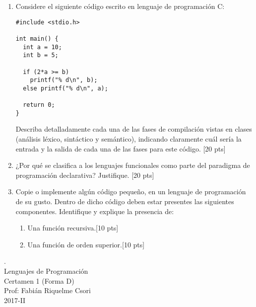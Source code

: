\documentclass[letter,12pt,oneside]{book}
\theoremstyle{definition}
\begin{document}
\begin{enumerate}
    \item Considere el siguiente código escrito en lenguaje de programación C:
    
    \begin{lstlisting}[style=CStyle]
#include <stdio.h>

int main() {
  int a = 10;
  int b = 5;
  
  if (2*a >= b)
    printf("% d\n", b);
  else printf("% d\n", a);
  
  return 0;
}
\end{lstlisting}
Describa detalladamente cada una de las fases de compilación vistas en clases (análisis léxico, sintáctico y semántico), indicando claramente cuál sería la entrada y la salida de cada una de las fases para este código. \tabto{80ex}[20 pts]
    
\item ¿Por qué se clasifica a los lenguajes funcionales como parte del paradigma de programación declarativa? Justifique. \tabto{80ex}[20 pts]

\item Copie o implemente algún código pequeño, en un lenguaje de programación de su gusto. Dentro de dicho código deben estar presentes las siguientes componentes. Identifique y explique la presencia de:
    \begin{enumerate}
    \item Una función recursiva.\tabto{75ex}[10 pts]
    \item Una función de orden superior.\tabto{75ex}[10 pts]
    \end{enumerate}
\end{enumerate}

\newpage

\begin{center}
 {\Large
  {\color{white}.}\\[5ex]
  Lenguajes de Programación\\[1ex]
  Certamen 1 (Forma D)}\\[1.2ex]
  Prof: Fabián Riquelme Csori\\
  2017-II
\end{center}
\end{document}
